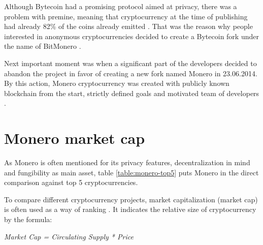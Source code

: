 \documentclass[
  printed, %
  table,   %
  nolof,     %
  nolot,     %
           oneside, color
]{fithesis3}
\begin{document}
Although Bytecoin had a promising protocol aimed at privacy, there was a problem with premine, meaning that cryptocurrency at the time of publishing had already 82\% of the coins already emitted \cite{fluffyponyonbytecoin}.
That was the reason why people interested in anonymous cryptocurrencies decided to create a Bytecoin fork under the name of BitMonero \cite{bitmonero}. 



Next important moment was when a significant part of the developers decided to abandon the project in favor of creating a new fork named Monero in 23.06.2014. By this action, Monero cryptocurrency was created with publicly known blockchain from the start, strictly defined goals and motivated team of developers \cite{monerofork}.


\section{Monero market cap}
 As Monero is often mentioned for its privacy features, decentralization in mind and fungibility as main asset, table \ref{table:monero-top5} puts Monero in the direct comparison against top 5 cryptocurrencies.

To compare different cryptocurrency projects, market capitalization (market cap) is often used as a way of ranking \cite{elbahrawy2017evolutionary}. It indicates the relative size of cryptocurrency by the formula: \\ \centerline{
 \textit{\textit{Market Cap = Circulating Supply * Price} }}
 
\end{document}
